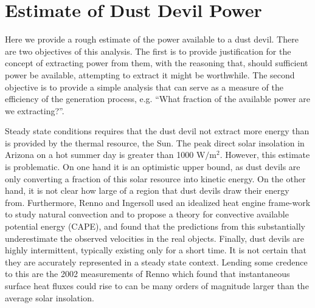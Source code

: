 \section{Estimate of Dust Devil Power}
\label{sec:estimate_power}

Here we provide a rough estimate of the power
available to a dust devil. There are two objectives of this
analysis. The first is to provide justification for the concept of
extracting power from them, with the reasoning that, should
sufficient power be available, attempting to extract it might be
worthwhile. The second objective is to provide a simple analysis that
can serve as a measure of the efficiency of the generation process,
e.g. ``What fraction of the available power are we extracting?''.  

Steady state conditions requires that the dust devil not
extract more energy than is provided by the thermal resource, the Sun.   
The peak direct solar insolation in Arizona on a hot summer day is
greater than 1000 $\text{W}/\text{m}^2$. However, this estimate is problematic. 
On one hand it is an optimistic upper bound, as dust devils are only
converting a fraction of this solar resource into kinetic
energy. On the other hand, it is not clear how large of a region
that dust devils draw their energy from. 
Furthermore, Renno and Ingersoll\cite{renno1996natural} used an
idealized heat engine frame-work to study natural convection and to
propose a theory for convective available potential energy (CAPE),
and found that the predictions from this substantially underestimate the
observed velocities in the real objects. Finally, dust devils are highly 
intermittent, typically existing only for a short time. It is
not certain that they are accurately represented in a steady
state context. Lending some credence to this are the 2002 measurements of
Renno\cite{renno2004matador} which found that instantaneous surface heat
fluxes could rise to can be many orders of magnitude larger than the
average solar insolation.  

